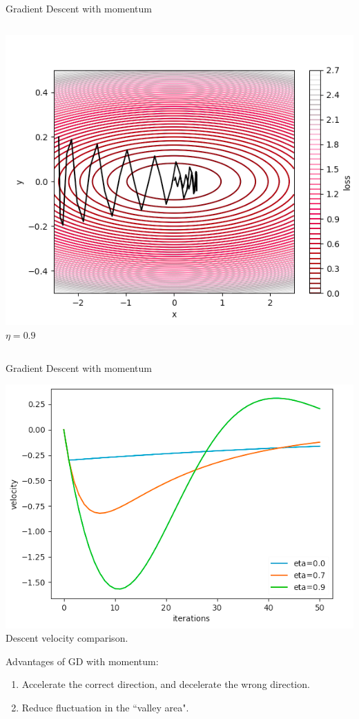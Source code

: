 \documentclass{beamer}
\begin{document}
\begin{frame}{Gradient Descent with momentum}
\begin{columns}[T,onlytextwidth]
	\centering 
	\includegraphics[width=1\columnwidth]{img/momentum09.png}
	$\eta = 0.9$

\end{columns}


\end{frame}
\begin{frame}{Gradient Descent with momentum}


\begin{center}
    \includegraphics[width=.6\columnwidth]{img/velocity_momentum.png}
    \\
    Descent velocity comparison.
\end{center}
Advantages of GD with momentum:
\begin{enumerate}
    \item Accelerate the correct direction, and decelerate the wrong direction.
    \item Reduce fluctuation in the ``valley area".
\end{enumerate}



\end{frame}
\end{document}

